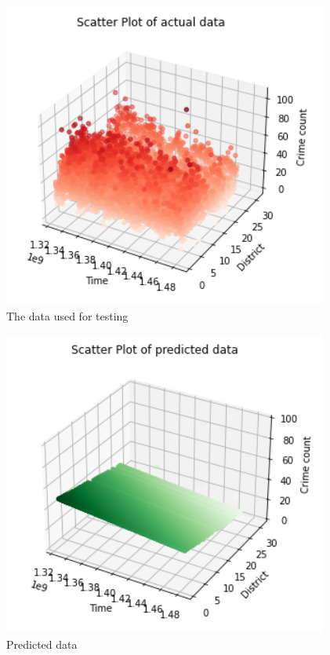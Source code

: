 \documentclass[a4paper, twocolumn]{article}
\begin{document}
\begin{figure}[h]
    \label{figure:}
    \includegraphics[scale=0.3]{fig7.png}
    \caption{The data used for testing}
\end{figure}

\begin{figure}[h]
    \label{figure:}
    \includegraphics[scale=0.3]{fig8.png}
    \caption{Predicted data}
\end{figure}
\end{document}
